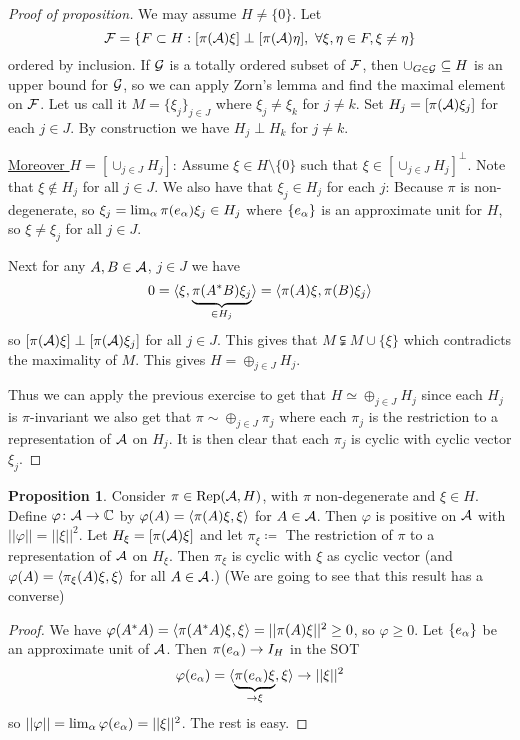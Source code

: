 \documentclass[10pt,english,a4paper]{article}
\theoremstyle{definition}
\newtheorem*{proposition}{Proposition}
\DeclareMathOperator{\Rep}{Rep}
\def\vphi{\varphi}
\begin{document}
\begin{proof}[Proof of proposition]
    We may assume $H\neq \{0\}$. Let 
\[ \mathcal{F} = \{ F\subset H : [\pi(\mathcal{A})\xi] \perp [\pi(\mathcal{A})\eta], ~\forall \xi,\eta \in F, \xi\neq \eta\} \]
ordered by inclusion. If $\mathcal{G}$ is a totally ordered subset of $\mathcal{F}$, then 
$\cup_{G \in \mathcal{G}} \subseteq H$ is an upper bound for $\mathcal{G}$, so we can apply 
Zorn's lemma and find the maximal element on $\mathcal{F}$. Let us call it 
$M  = \{\xi_j\}_{j\in J}$ where $\xi_j\neq \xi_k$ for $j\neq k$. Set
$H_j =[\pi(\mathcal{A})\xi_j]$ for each $j\in J$. By construction we have 
$H_j \perp H_k$ for $j\neq k$. 

\ul{Moreover $H = [\cup_{j\in J}H_j]$}: Assume $\xi \in H\setminus \{0\}$ such that 
$\xi \in [\cup_{j\in J}H_j]^{\perp}$. Note that $\xi \not\in H_j$ for all $j\in J$.
We also have that $\xi_j \in H_j$ for each $j$: Because $\pi$ is non-degenerate, so 
$\xi_j = \lim_{\alpha}\pi(e_{\alpha})\xi_j \in H_j$ where $\{e_{\alpha}\}$ is an approximate
unit for $H$, so $\xi\neq \xi_j$ for all $j\in J$.

Next for any $A,B \in \mathcal{A}$, $j\in J$ we have 
\[ 0 = \langle \xi,\underbrace{\pi(A^*B)\xi_j}_{\in H_j} \rangle = \left\langle \pi(A)\xi,\pi(B)\xi_j \right\rangle  \] 
so
$[\pi(\mathcal{A})\xi]\perp [\pi(\mathcal{A})\xi_j]$ for all $j\in J$. This gives that $M
\subsetneqq M \cup \{\xi\}$ which contradicts the maximality of $M$. This gives 
$H = \oplus_{j\in J} H_j$. 

Thus we
can apply the previous exercise to get that $H \simeq \oplus_{j\in J} H_j$
since each $H_j$ is $\pi$-invariant we also get that $\pi\sim \oplus_{j\in J}
\pi_j$ where each $\pi_j$ is the restriction to a representation of $\mathcal{A}$ on
$H_j$. It is then clear that each $\pi_j$ is cyclic with cyclic vector $\xi_j$.
\end{proof}

\begin{proposition}
    Consider $\pi \in \Rep(\As,H)$, with $\pi$ non-degenerate and $\xi \in H$.
Define $\vphi\colon \As \to \C$ by $\vphi(A) = \ind{\pi(A)\xi,\xi}$ for $A\in
\mathcal{A}$. Then $\vphi$ is  positive on $\mathcal{A}$ with 
$||\vphi|| = ||\xi||^2$. Let $H_{\xi} = [\pi(\mathcal{A})\xi]$ and let 
$\pi_{\xi} \coloneqq $ The restriction of $\pi$ to a representation of $\mathcal{A}$ on 
$H_{\xi}$. Then $\pi_{\xi}$ is cyclic with $\xi$ as cyclic vector 
(and $\vphi(A) = \ind{\pi_{\xi}(A)\xi,\xi} $ for all $A \in \mathcal{A}$.)
(We are going to see that this result has a converse)
\end{proposition}
\begin{proof}
   We have 
$\vphi(A^*A) = \ind{\pi(A^*A)\xi,\xi} = ||\pi(A)\xi||^2 \geq 0$, so $\vphi\geq 0$.
Let $\{e_{\alpha}\}$ be an approximate unit of $\mathcal{A}$. Then 
$\pi(e_{\alpha}) \to I_{H}$ in the SOT
\begin{align*}
    \vphi(e_{\al}) = \indi{\ub{\pi(e_{\al})\xi}_{\to\xi},\xi}\to ||\xi||^2
\end{align*}
so $||\vphi|| = \lim_{\al}\vphi(e_{\al}) = ||\xi||^2$. The rest is easy. 
\end{proof}
\end{document}
